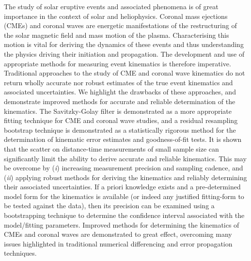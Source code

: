 \documentclass[structabstract]{aa}
\begin{document}
\date{Received ?; accepted ?}
\abstract
{The study of solar eruptive events and associated phenomena is of great importance in the context of solar and heliophysics. Coronal mass ejections (CMEs) and coronal waves are energetic manifestations of the restructuring of the solar magnetic field and mass motion of the plasma. Characterising this motion is vital for deriving the dynamics of these events and thus understanding the physics driving their initiation and propagation. The development and use of appropriate methods for measuring event kinematics is therefore imperative.} 
{Traditional approaches to the study of CME and coronal wave kinematics do not return wholly accurate nor robust estimates of the true event kinematics and associated uncertainties. We highlight the drawbacks of these approaches, and demonstrate improved methods for accurate and reliable determination of the kinematics.}
{The Savitzky-Golay filter is demonstrated as a more appropriate fitting technique for CME and coronal wave studies, and a residual resampling bootstrap technique is demonstrated as a statistically rigorous method for the determination of kinematic error estimates and goodness-of-fit tests.}
{It is shown that the scatter on distance-time measurements of small sample size can significantly limit the ability to derive accurate and reliable kinematics. This may be overcome by (\emph{i}) increasing measurement precision and sampling cadence, and (\emph{ii}) applying robust methods for deriving the kinematics and reliably determining their associated uncertainties. If a priori knowledge exists and a pre-determined model form for the kinematics is available (or indeed any justified fitting-form to be tested against the data), then its precision can be examined using a bootstrapping technique to determine the confidence interval associated with the model/fitting parameters.}
{Improved methods for determining the kinematics of CMEs and coronal waves are demonstrated to great effect, overcoming many issues highlighted in traditional numerical differencing and error propagation techniques.}



\maketitle
\end{document}
